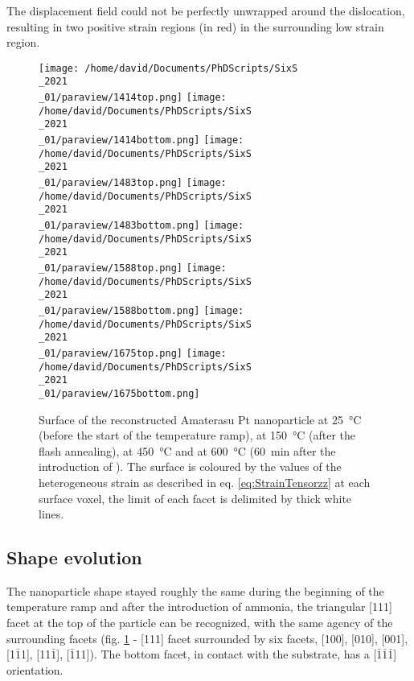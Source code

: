 The displacement field could not be perfectly unwrapped around the dislocation, resulting in two positive strain regions (in red) in the surrounding low strain region.

\begin{figure}[!htb]
    \centering
    \texttt{[image: /home/david/Documents/PhDScripts/SixS\\\_2021\\\_01/paraview/1414top.png]}
    \texttt{[image: /home/david/Documents/PhDScripts/SixS\\\_2021\\\_01/paraview/1414bottom.png]}
    \texttt{[image: /home/david/Documents/PhDScripts/SixS\\\_2021\\\_01/paraview/1483top.png]}
    \texttt{[image: /home/david/Documents/PhDScripts/SixS\\\_2021\\\_01/paraview/1483bottom.png]}
    \texttt{[image: /home/david/Documents/PhDScripts/SixS\\\_2021\\\_01/paraview/1588top.png]}
    \texttt{[image: /home/david/Documents/PhDScripts/SixS\\\_2021\\\_01/paraview/1588bottom.png]}
    \texttt{[image: /home/david/Documents/PhDScripts/SixS\\\_2021\\\_01/paraview/1675top.png]}
    \texttt{[image: /home/david/Documents/PhDScripts/SixS\\\_2021\\\_01/paraview/1675bottom.png]}
    \caption{
        Surface of the reconstructed Amaterasu Pt nanoparticle at \qty{25}{\degreeCelsius} (before the start of the temperature ramp), at \qty{150}{\degreeCelsius} (after the flash annealing), at \qty{450}{\degreeCelsius} and at \qty{600}{\degreeCelsius} (\qty{60}{\minute} after the introduction of \ammonia).
        The surface is coloured by the values of the heterogeneous strain as described in eq. \ref{eq:StrainTensorzz} at each surface voxel, the limit of each facet is delimited by thick white lines.
    }
    \label{fig:Amaterasu}
\end{figure}

\subsection{Shape evolution}

The nanoparticle shape stayed roughly the same during the beginning of the temperature ramp and after the introduction of ammonia, the triangular [111] facet at the top of the particle can be recognized, with the same agency of the surrounding facets (fig. \ref{fig:Amaterasu} - [111] facet surrounded by six facets, [100], [010], [001], [1$\bar{1}$1], [11$\bar{1}$], [$\bar{1}$11]).
The bottom facet, in contact with the substrate, has a [$\bar{1}\bar{1}\bar{1}$] orientation.

